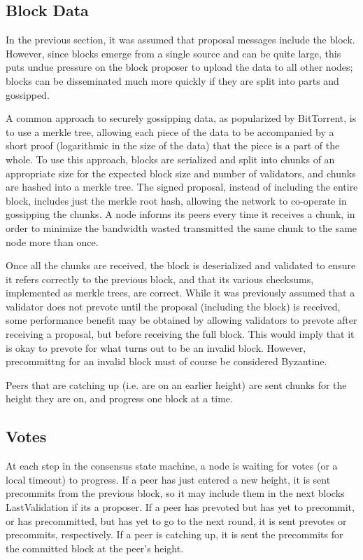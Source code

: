 \subsection{Block Data}
In the previous section, it was assumed that proposal messages include the block.
However, since blocks emerge from a single source and can be quite large, 
this puts undue pressure on the block proposer to upload the data to all other nodes;
blocks can be disseminated much more quickly if they are split into parts and gossipped.

A common approach to securely gossipping data, as popularized by BitTorrent, is to use a merkle tree,
allowing each piece of the data to be accompanied by a short proof (logarithmic in the size of the data)
that the piece is a part of the whole. 
To use this approach, blocks are serialized and split into chunks of an appropriate size for the expected block size and number of validators,
and chunks are hashed into a merkle tree. The signed proposal, instead of including the entire block, includes just the merkle root hash,
allowing the network to co-operate in gossipping the chunks.
A node informs its peers every time it receives a chunk, in order to minimize the bandwidth wasted transmitted the same chunk to the same node more than once.

Once all the chunks are received, the block is deserialized and validated to ensure it refers correctly to the previous 
block, and that its various checksums, implemented as merkle trees, are correct. 
While it was previously assumed that a validator does not prevote until the proposal (including the block) is received,
some performance benefit may be obtained by allowing validators to prevote after receiving a proposal, 
but before receiving the full block. This would imply that it is okay to prevote for what turns out to be an invalid block.
However, precommittng for an invalid block must of course be considered Byzantine.

Peers that are catching up (i.e. are on an earlier height) are sent chunks for the height they are on,
and progress one block at a time.

\subsection{Votes}

At each step in the consensus state machine, a node is waiting for votes (or a local timeout) to progress.
If a peer has just entered a new height, it is sent precommits from the previous block,
so it may include them in the next blocks LastValidation if its a proposer.
If a peer has prevoted but has yet to precommit, or has precommitted, but has yet to go to the next round,
it is sent prevotes or precommits, respectively.
If a peer is catching up, it is sent the precommits for the committed block at the peer's height.

